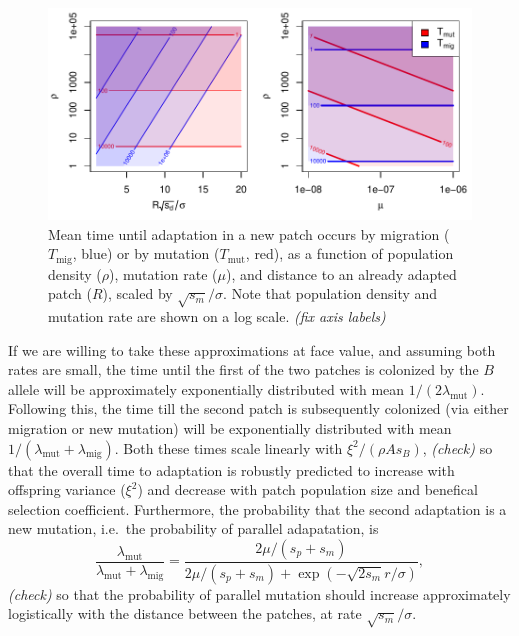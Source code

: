 \documentclass{article}
\newcommand{\migrate}{\lambda_\text{mig}}
\newcommand{\mutrate}{\lambda_\text{mut}}
\newcommand{\Tmig}{T_\text{mig}}
\newcommand{\Tmut}{T_\text{mut}}
\newcommand{\plr}[1]{{\it\color{blue}(#1)}}
\begin{document}
\begin{figure}[ht]
  \begin{center}
    \includegraphics{phase-diagram-log}
  \end{center}
  \caption{
  Mean time until adaptation in a new patch occurs by migration ($\Tmig$, blue) or by mutation ($\Tmut$, red),
  as a function of population density ($\rho$), mutation rate ($\mu$), 
  and distance to an already adapted patch ($R$), scaled by $\sqrt{s_m}/\sigma$.
  Note that population density and mutation rate are shown on a log scale.
  \plr{fix axis labels}
  \label{fig:phase_diagram}
  }
\end{figure}

If we are willing to take these approximations at face value, 
and assuming both rates are small, 
the time until the first of the two patches is colonized by the $B$ allele will be approximately exponentially distributed with mean $1/(2 \mutrate)$.
Following this, the time till the second patch is subsequently colonized 
(via either migration or new mutation) 
will be exponentially distributed with mean $1/(\mutrate+\migrate)$.
Both these times scale linearly with $\xi^2/(\rho A s_{B})$, \plr{check}
so that the overall time to adaptation is robustly predicted to increase with offspring variance ($\xi^2$)
and decrease with patch population size and benefical selection coefficient.
Furthermore, the probability that the second adaptation is a new mutation,
i.e.\ the probability of parallel adapatation, is
\begin{equation}
  \frac{\mutrate}{\mutrate+\migrate} = \frac{2\mu/(s_p+s_m)}{2\mu/(s_p+s_m) + \exp\left(- \sqrt{2 s_m} r / \sigma \right) },
\end{equation}
\plr{check}
so that the probability of parallel mutation should increase
approximately logistically with the distance between the patches, at rate $\sqrt{s_m} /\sigma$. 
\end{document}
